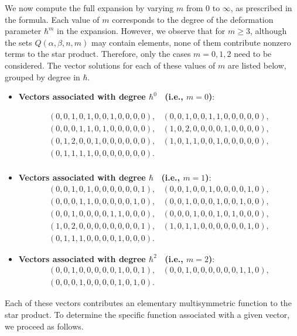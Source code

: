 \documentclass[11pt]{article}
\begin{document}
We now compute the full expansion by varying $m$ from $0$ to $\infty$, as prescribed in the formula. Each value of $m$ corresponds to the degree of the deformation parameter $\hbar^m$ in the expansion. However, we observe that for $ m \geq 3$, although the sets $ Q(\alpha, \beta, n, m)$ may contain elements, none of them contribute nonzero terms to the star product. Therefore, only the cases $m = 0, 1, 2 $ need to be considered. The vector solutions for each of these values of $m$ are listed below, grouped by degree in $\hbar$.
    \begin{itemize}
     \item \textbf{Vectors associated with degree $\hbar^0$ \ (i.e., $ m = 0$)}:           
                
            $$ \begin{array}{cc}
                (0, 0, 1, 0, 1, 0, 0, 1, 0, 0, 0, 0),&
                (0, 0, 1, 0, 0, 1, 1, 0, 0, 0, 0, 0),\\
                (0, 0, 0, 1, 1, 0, 1, 0, 0, 0, 0, 0),&
                (1, 0, 2, 0, 0, 0, 0, 1, 0, 0, 0, 0),\\
                (0, 1, 2, 0, 0, 1, 0, 0, 0, 0, 0, 0),&
                (1, 0, 1, 1, 0, 0, 1, 0, 0, 0, 0, 0),\\
                (0, 1, 1, 1, 1, 0, 0, 0, 0, 0, 0, 0).\\
            \end{array}$$
 \item \textbf{Vectors associated with degree $\hbar$ \ (i.e., $ m = 1$)}:           
            $$\begin{array}{cc}
                 (0, 0, 1, 0, 1, 0, 0, 0, 0, 0, 0, 1),&
                 (0, 0, 1, 0, 0, 1, 0, 0, 0, 0, 1, 0),\\
                 (0, 0, 0, 1, 1, 0, 0, 0, 0, 0, 1, 0),&
                 (0, 0, 1, 0, 0, 0, 1, 0, 0, 1, 0, 0),\\
                 (0, 0, 1, 0, 0, 0, 0, 1, 1, 0, 0, 0),&
                 (0, 0, 0, 1, 0, 0, 1, 0, 1, 0, 0, 0),\\
                 (1, 0, 2, 0, 0, 0, 0, 0, 0, 0, 0, 1),&
                 (1, 0, 1, 1, 0, 0, 0, 0, 0, 0, 1, 0),\\
                 (0, 1, 1, 1, 0, 0, 0, 0, 1, 0, 0, 0).
            \end{array}$$
            
                 \item \textbf{Vectors associated with degree $\hbar^2$ \ (i.e., $ m = 2$)}:                       
     $$\begin{array}{cc}
                (0, 0, 1, 0, 0, 0, 0, 0, 1, 0, 0, 1),&
                (0, 0, 1, 0, 0, 0, 0, 0, 0, 1, 1, 0),\\
                (0, 0, 0, 1, 0, 0, 0, 0, 1, 0, 1, 0).
            \end{array}$$
    \end{itemize}
Each of these vectors contributes an elementary multisymmetric function to the star product. To determine the specific function associated with a given vector, we proceed as follows.
\end{document}
